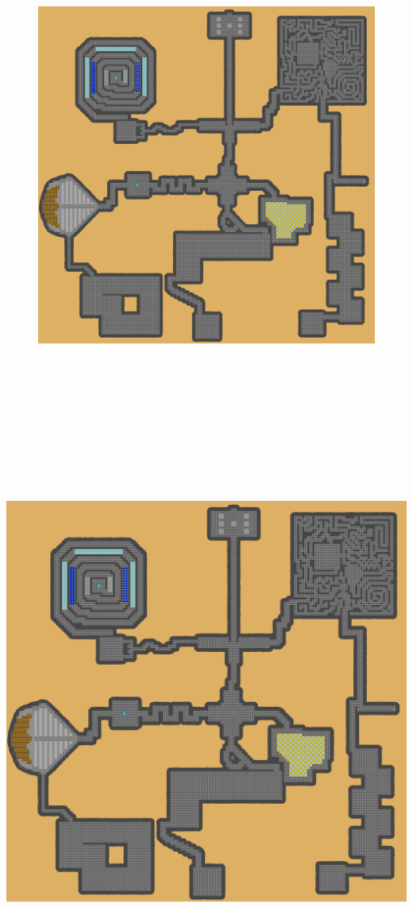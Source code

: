 \documentclass[a4paper, landscape]{article}
\begin{document}
	\begin{figure}
\includegraphics[trim = 1964 2930 2323 1620, clip, height = 15cm, width = 28cm]{Dungeon_playersmap.png}
	\end{figure}
\clearpage
\includegraphics[trim = 1184 2850 3103 1620, clip, height = 19cm, width = 28cm]{Dungeon_playersmap.png}
\end{document}
